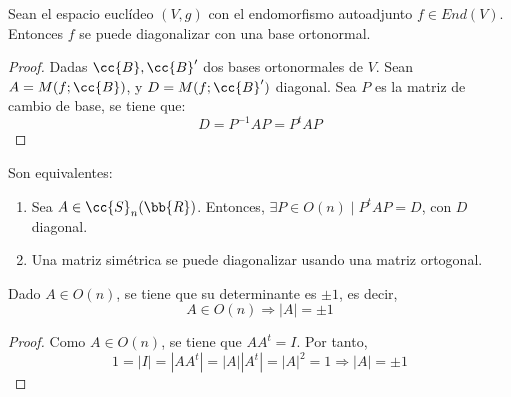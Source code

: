 \begin{coro}
    Sean el espacio euclídeo $(V,g)$ con el endomorfismo autoadjunto $f\in End(V)$. Entonces $f$ se puede diagonalizar con una base ortonormal.
\end{coro}
\begin{proof}
    Dadas $\cc{B}, \cc{B}'$ dos bases ortonormales de $V$. Sean $A=M(f;\cc{B})$, y $D=M(f;\cc{B}')$ diagonal. Sea $P$ es la matriz de cambio de base, se tiene que:
    \begin{equation*}
        D=P^{-1}AP = P^tAP
    \end{equation*}
\end{proof}

\begin{coro}
    Son equivalentes:
    \begin{enumerate}
        \item Sea $A\in \cc{S}_n(\bb{R})$. Entonces, $\exists P\in O(n)\mid P^tAP = D$, con $D$ diagonal.

        \item Una matriz simétrica se puede diagonalizar usando una matriz ortogonal.
    \end{enumerate}
\end{coro}

\begin{prop}
    Dado $A\in O(n)$, se tiene que su determinante es $\pm 1$, es decir,
    \begin{equation*}
        A\in O(n)\Longrightarrow |A|=\pm 1
    \end{equation*}
\end{prop}
\begin{proof}
    Como $A\in O(n)$, se tiene que $AA^t=I$. Por tanto,
    \begin{equation*}
        1=|I|=|AA^t|=|A||A^t|= |A|^2 = 1 \Longrightarrow |A|=\pm 1
    \end{equation*}
\end{proof}

